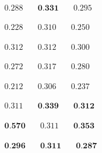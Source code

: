 \newsavebox\pcpFoote
\begin{lrbox}{\pcpFoote}
   $\begin{aligned}
     0.288 & \quad \textbf{0.331} & \quad 0.295
    \end{aligned} $
\end{lrbox}

\newsavebox\pcpCNMF
\begin{lrbox}{\pcpCNMF}
   $\begin{aligned}
     0.228 & \quad 0.310 & \quad 0.250
    \end{aligned} $
\end{lrbox}

\newsavebox\tonnetzSF
\begin{lrbox}{\tonnetzSF}
   $\begin{aligned}
     0.312 & \quad 0.312 & \quad 0.300
    \end{aligned} $
\end{lrbox}

\newsavebox\tonnetzFoote
\begin{lrbox}{\tonnetzFoote}
   $\begin{aligned}
     0.272 & \quad 0.317 & \quad 0.280
    \end{aligned} $
\end{lrbox}

\newsavebox\tonnetzCNMF
\begin{lrbox}{\tonnetzCNMF}
   $\begin{aligned}
     0.212 & \quad 0.306 & \quad 0.237
    \end{aligned} $
\end{lrbox}

\newsavebox\cqtSF
\begin{lrbox}{\cqtSF}
   $\begin{aligned}
     0.311 & \quad \textbf{0.339} & \quad \textbf{0.312}
    \end{aligned} $
\end{lrbox}

\newsavebox\cqtFoote
\begin{lrbox}{\cqtFoote}
   $\begin{aligned}
     \textbf{0.570} & \quad 0.311 & \quad \textbf{0.353}
    \end{aligned} $
\end{lrbox}

\newsavebox\cqtCNMF
\begin{lrbox}{\cqtCNMF}
   $\begin{aligned}
     \textbf{0.296} & \quad \textbf{0.311} & \quad \textbf{0.287}
    \end{aligned} $
\end{lrbox}

